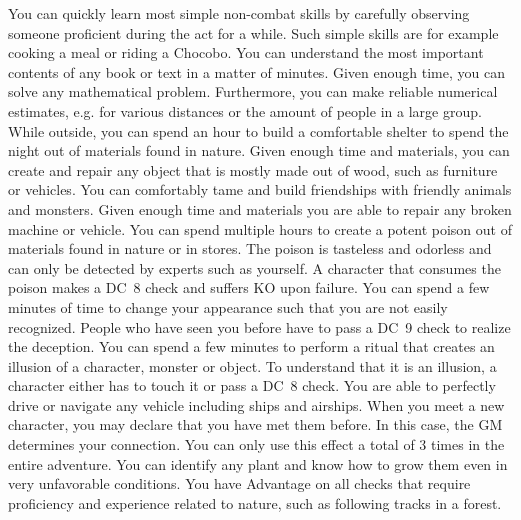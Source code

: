 \vfill
{}
{
	You can quickly learn most simple non-combat skills by carefully observing someone proficient during the act for a while. 
	Such simple skills are for example cooking a meal or riding a Chocobo.
}
\newpage
{}
{
	You can understand the most important contents of any book or text in a matter of minutes.
}
\vfill
{}
{
	Given enough time, you can solve any mathematical problem.
	Furthermore, you can make reliable numerical estimates, e.g. for various distances or the amount of people in a large group.
}
\vfill
{}
{
	While outside, you can spend an hour to build a comfortable shelter to spend the night out of materials found in nature.
}	
\vfill
{}
{
	Given enough time and materials, you can create and repair any object that is mostly made out of wood, such as furniture or vehicles.
}
\vfill
{}
{
	You can comfortably tame and build friendships with friendly animals and monsters.
}
\vfill
{}
{
	Given enough time and materials you are able to repair any broken machine or vehicle. 
}
\vfill
{}
{
	You can spend multiple hours to create a potent poison out of materials found in nature or in stores.
	The poison is tasteless and odorless and can only be detected by experts such as yourself.
	A character that consumes the poison makes a DC~8 check and suffers KO upon failure.
}
\vfill
{}
{
	You can spend a few minutes of time to change your appearance such that you are not easily recognized.
	People who have seen you before have to pass a DC~9 check to realize the deception.
}
\vfill
{}
{
	You can spend a few minutes to perform a ritual that creates an illusion of a character, monster or object.
	To understand that it is an illusion, a character either has to touch it or pass a DC~8 check.
}
\vfill
{}
{
	You are able to perfectly drive or navigate any vehicle including ships and airships. 
}
\vfill
{}
{
	When you meet a new character, you may declare that you have met them before.
	In this case, the GM determines your connection.	
	You can only use this effect a total of 3 times in the entire adventure.
}
\vfill
{} 
{
	You can identify any plant and know how to grow them even in very unfavorable conditions.
}
\vfill
{}
{
	You have Advantage on all checks that require proficiency and experience related to nature, such as following tracks in a forest. 
}
%
\newpage
%
